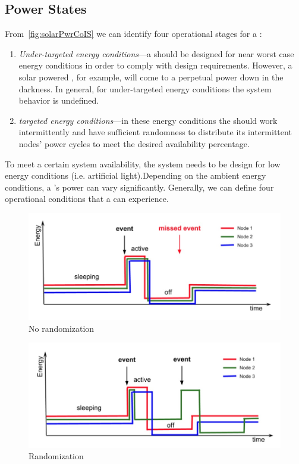 \subsection{\fullsys Power States}
From~\ref{fig:solarPwrCoIS} we can identify four operational stages for a \sys:
\begin{enumerate}
		\item \textit{Under-targeted energy conditions}---a \sys should be designed for near worst case energy conditions in order to comply with design requirements. However, a solar powered \sys, for example,  will come to a perpetual power down in the darkness. In general, for under-targeted energy conditions the system behavior is undefined.
		\item \textit{targeted energy conditions}---in these energy conditions the \sys should work intermittently and have sufficient randomness to distribute its intermittent nodes' power cycles to meet the desired availability percentage. 
\end{enumerate}


To meet a certain system availability, the system needs to be design for low energy conditions (i.e. artificial light).Depending on the ambient energy conditions, a \sys's power can vary significantly.  Generally, we can define four operational conditions that a \sys can experience.

\begin{figure}
		\centering
		\includegraphics[width=\columnwidth]{figures/noRandomization}
		\caption{ No randomization}
		\label{fig:noRand}
\end{figure} 

\begin{figure}
		\centering
		\includegraphics[width=\columnwidth]{figures/randomization}
		\caption{ Randomization}
		\label{fig:noRand}
\end{figure} 

